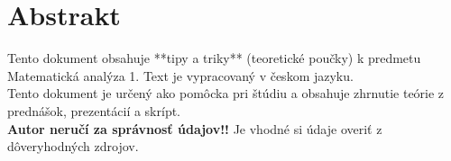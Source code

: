\section*{Abstrakt}
Tento dokument obsahuje **tipy a triky** (teoretické poučky) k predmetu Matematická analýza 1. Text je vypracovaný v českom jazyku. \\

\noindent Tento dokument je určený ako pomôcka pri štúdiu a obsahuje zhrnutie teórie z prednášok, prezentácií a skrípt. \\

\noindent \textbf{Autor neručí za správnosť údajov!!} Je vhodné si údaje overiť z dôveryhodných zdrojov.

